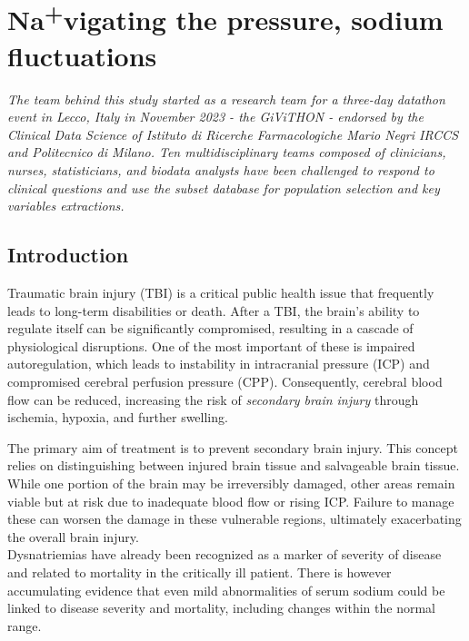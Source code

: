 \chapter[Na\textsuperscript{\scriptsize+}vigating the pressure, sodium fluctuations]{Na\textsuperscript{\scriptsize+}vigating the pressure, sodium fluctuations}

\textit{The team behind this study started as a research team for a three-day datathon event in Lecco, Italy in November 2023 - the GiViTHON - endorsed by the Clinical Data Science of Istituto di Ricerche Farmacologiche Mario Negri IRCCS and Politecnico di Milano. Ten multidisciplinary teams composed of clinicians, nurses, statisticians, and biodata analysts have been challenged to respond to clinical questions and use the subset database for population selection and   key variables extractions.} 

\section {Introduction}
Traumatic brain injury (TBI) is a critical public health issue that frequently leads to long-term disabilities or death. After a TBI, the brain’s ability to regulate itself can be significantly compromised, resulting in a cascade of physiological disruptions. One of the most important of these is impaired autoregulation, which leads to instability in intracranial pressure (ICP) and compromised cerebral perfusion pressure (CPP). Consequently, cerebral blood flow can be reduced, increasing the risk of \textit{secondary brain injury} through ischemia, hypoxia, and further swelling.

The primary aim of treatment is to prevent secondary brain injury. This concept relies on distinguishing between injured brain tissue and salvageable brain tissue. While one portion of the brain may be irreversibly damaged, other areas remain viable but at risk due to inadequate blood flow or rising ICP. Failure to manage these can worsen the damage in these vulnerable regions, ultimately exacerbating the overall brain injury.\\

Dysnatriemias have already been recognized as a marker of severity of disease and related to mortality in the critically ill patient. There is however accumulating evidence that even mild abnormalities of serum sodium could be linked to disease severity and mortality, including changes within the normal range\cite{sakrFluctuationsSerumSodium2013}.

